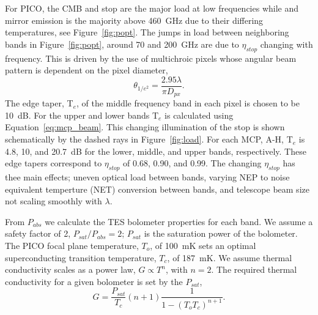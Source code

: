 \documentclass[]{spie}  %
\newcommand{\comr}[1]{\textcolor{red}{#1}}
\begin{document}
For PICO, the CMB and stop are the major load at low frequencies while and mirror emission 
is the majority above 460~GHz due to their differing temperatures, see Figure~\ref{fig:popt}. 
The jumps in load between neighboring bands in Figure~\ref{fig:popt}, around 70 and 200~GHz are due to $\eta_{stop}$ changing with frequency.  This is 
driven by the use of multichroic pixels whose angular beam pattern is dependent on the pixel diameter\cite{suzuki2013_thesis},
\begin{equation}
\label{eq:mcp_beam}
\theta_{1/e^2} = \frac{2.95 \lambda}{\pi D_{px}}. 
\end{equation} 
The edge taper, T$_e$, of the middle frequency band in each pixel is chosen to be 10~dB. For the upper and lower bands T$_e$ is calculated using 
Equation~\ref{eq:mcp_beam}. This changing illumination of the stop is shown schematically by the dashed rays in Figure~\ref{fig:load}. 
For each MCP, A-H, T$_e$ is 4.8, 10, and 20.7~dB for the lower, middle, and upper bands, respectively.  These 
edge tapers correspond to $\eta_{stop}$ of 0.68, 0.90, and 0.99.
The changing $\eta_{stop}$ has thee main effects; uneven optical load between bands, varying NEP to noise equivalent temperture (NET) conversion 
between bands, and telescope beam size not scaling smoothly with $\lambda$.

From $P_{abs}$ we calculate the TES bolometer properties for each band.  We assume a safety factor of 2, $P_{sat}/P_{abs}=2$; $P_{sat}$ is the 
saturation power of the bolometer.  The PICO focal plane temperature, $T_o$, of 100~mK sets an optimal superconducting transition temperature, 
$T_c$, of 187~mK.  We assume thermal conductivity scales as a power law, $G \propto T^n$,  with $n=2$.  The required thermal conductivity for 
a given bolometer is set by the $P_{sat}$,
\begin{equation}
\label{eq:G}
G = \frac{P_{sat}}{T_c} (n+1) \frac{1}{1-\left({T_o}{T_c}\right)^{n+1} }. 
\end{equation} 
\end{document}

